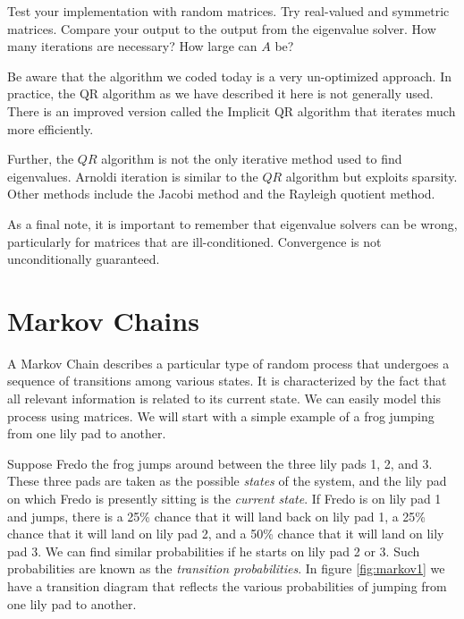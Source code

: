 \begin{problem}
Test your implementation with random matrices.
Try real-valued and symmetric matrices.
Compare your output to the output from the eigenvalue solver.
How many iterations are necessary?
How large can $A$ be?
\end{problem}

Be aware that the algorithm we coded today is a very un-optimized approach.
In practice, the QR algorithm as we have described it here is not generally used.
There is an improved version called the Implicit QR algorithm that iterates much more efficiently.

Further, the $QR$ algorithm is not the only iterative method used to find eigenvalues.
Arnoldi iteration is similar to the $QR$ algorithm but exploits sparsity.
Other methods include the Jacobi method and the Rayleigh quotient method.

As a final note, it is important to remember that eigenvalue solvers can be wrong, particularly for matrices that are ill-conditioned. Convergence is not unconditionally guaranteed. 

\section*{Markov Chains}
A Markov Chain describes a particular type of random process that
undergoes a sequence of transitions among various states. It is
characterized by the fact that all relevant information is related to its current state.
We can easily model this process using matrices.
We will start with a simple example of a frog jumping from one lily pad to another.

Suppose Fredo the frog jumps around between the three lily pads 1, 2, and 3.
These three pads are taken as the possible \emph{states} of the system, and the
lily pad on which Fredo is presently sitting is the \emph{current state}.
If Fredo is on lily pad 1 and jumps, there is a 25\% chance that it will land back on lily pad 1, a 25\% chance that it will land on lily pad 2, and a 50\% chance that it will land on lily pad 3.
We can find similar probabilities if he starts on lily pad 2 or 3.
Such probabilities are known as the \emph{transition probabilities}.
In figure \ref{fig:markov1} we have a transition diagram that reflects the various probabilities of jumping from one lily pad to another.

